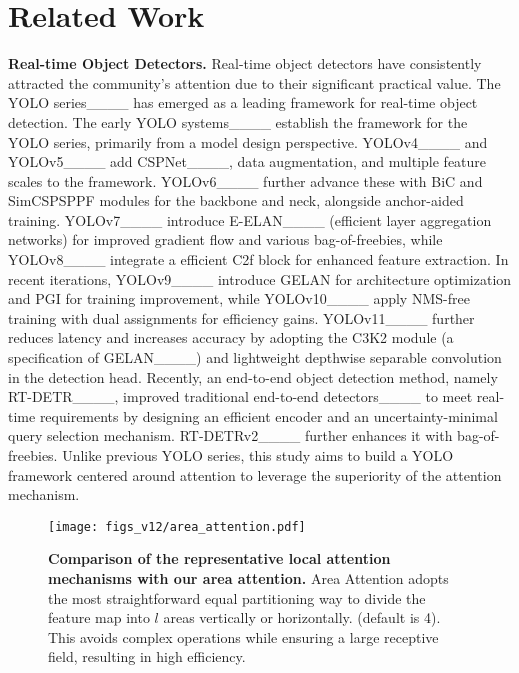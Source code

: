 \section{Related Work}
\label{sec:related}



\noindent\textbf{Real-time Object Detectors.} 
Real-time object detectors have consistently attracted the community's attention due to their significant practical value.
%
The YOLO series____ has emerged as a leading framework for real-time object detection.
%
The early YOLO systems____ establish the framework for the YOLO series, primarily from a model design perspective. 
%
YOLOv4____ and YOLOv5____ add CSPNet____, data augmentation, and multiple feature scales to the framework. YOLOv6____ further advance these with BiC and SimCSPSPPF modules for the backbone and neck, alongside anchor-aided training. 
%
YOLOv7____ introduce E-ELAN____ (efficient layer aggregation networks) for improved gradient flow and various bag-of-freebies, while YOLOv8____ integrate a efficient C2f block for enhanced feature extraction.
%
In recent iterations, YOLOv9____ introduce GELAN for architecture optimization and PGI for training improvement, while YOLOv10____ apply NMS-free training with dual assignments for efficiency gains. YOLOv11____ further reduces latency and increases accuracy by adopting the C3K2 module (a specification of GELAN____) and lightweight depthwise separable convolution in the detection head. 
%
Recently, an end-to-end object detection method, namely RT-DETR____, improved traditional end-to-end detectors____ to meet real-time requirements by designing an efficient encoder and an uncertainty-minimal query selection mechanism. RT-DETRv2____ further enhances it with bag-of-freebies.
%
Unlike previous YOLO series, this study aims to build a YOLO framework centered around attention to leverage the superiority of the attention mechanism.



\begin{figure*}[t]
\centering
\texttt{[image: figs\_v12/area\_attention.pdf]}
\caption{\textbf{Comparison of the representative local attention mechanisms with our area attention.}  Area Attention adopts the most straightforward equal partitioning way to divide the feature map into $l$ areas vertically or horizontally. (default is 4). This avoids complex operations while ensuring a large receptive field, resulting in high efficiency.}
\label{fig:split}
\end{figure*}



